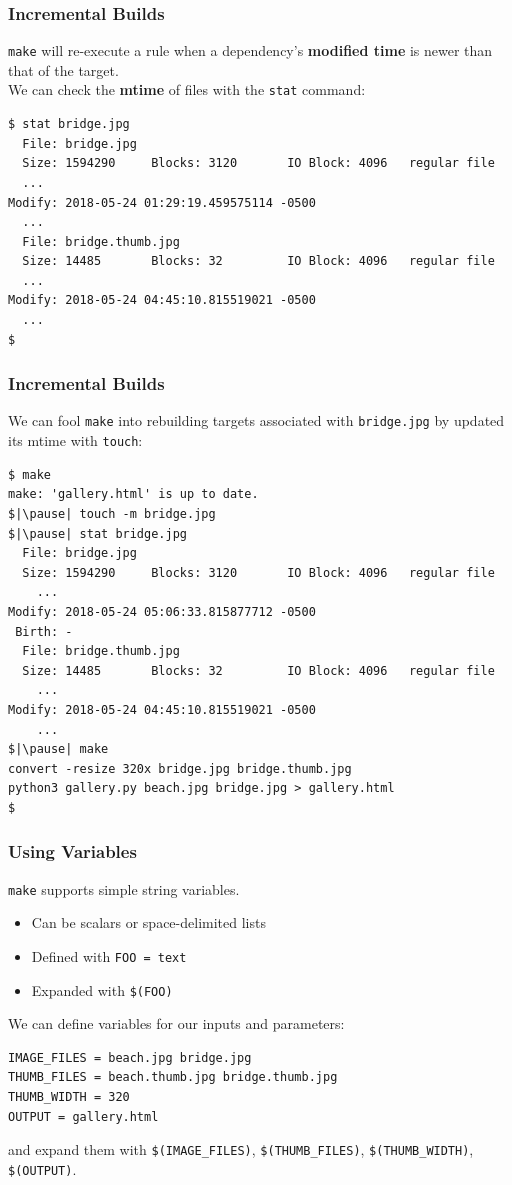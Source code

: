 \documentclass[xcolor=dvipsnames,t,compress]{beamer}
\begin{document}
\begin{frame}[fragile]
\frametitle{Incremental Builds}
\vspace{-1em}
\texttt{make} will re-execute a rule when a dependency's \textbf{modified time} is newer than that of the target.
\\
\newline
We can check the \textbf{mtime} of files with the \texttt{stat} command:
\begin{verbatim}
$ stat bridge.jpg
  File: bridge.jpg
  Size: 1594290   	Blocks: 3120       IO Block: 4096   regular file
  ...
Modify: 2018-05-24 01:29:19.459575114 -0500
  ...
  File: bridge.thumb.jpg
  Size: 14485     	Blocks: 32         IO Block: 4096   regular file
  ...
Modify: 2018-05-24 04:45:10.815519021 -0500
  ...
$
\end{verbatim}
\end{frame}

\begin{frame}[fragile]
\frametitle{Incremental Builds}
\vspace{-1em}
We can fool \texttt{make} into rebuilding targets associated with \texttt{bridge.jpg} by updated its mtime with \texttt{touch}:
\begin{verbatim}
$ make
make: 'gallery.html' is up to date.
$|\pause| touch -m bridge.jpg
$|\pause| stat bridge.jpg
  File: bridge.jpg
  Size: 1594290   	Blocks: 3120       IO Block: 4096   regular file
  	...
Modify: 2018-05-24 05:06:33.815877712 -0500
 Birth: -
  File: bridge.thumb.jpg
  Size: 14485     	Blocks: 32         IO Block: 4096   regular file
  	...
Modify: 2018-05-24 04:45:10.815519021 -0500
	...
$|\pause| make
convert -resize 320x bridge.jpg bridge.thumb.jpg
python3 gallery.py beach.jpg bridge.jpg > gallery.html
$
\end{verbatim}
\end{frame}

\begin{frame}[fragile]
\frametitle{Using Variables}
\vspace{-1em}
\texttt{make} supports simple string variables.
\begin{itemize}
\item Can be scalars or space-delimited lists
\item Defined with \texttt{FOO = text}
\item Expanded with \texttt{\$(FOO)}
\end{itemize}
\pause
\vspace{1em}
We can define variables for our inputs and parameters:
\begin{verbatim}
IMAGE_FILES = beach.jpg bridge.jpg
THUMB_FILES = beach.thumb.jpg bridge.thumb.jpg
THUMB_WIDTH = 320
OUTPUT = gallery.html
\end{verbatim}
and expand them with \texttt{\$(IMAGE\_FILES)}, \texttt{\$(THUMB\_FILES)}, \texttt{\$(THUMB\_WIDTH)}, \texttt{\$(OUTPUT)}.
\end{frame}
\end{document}
